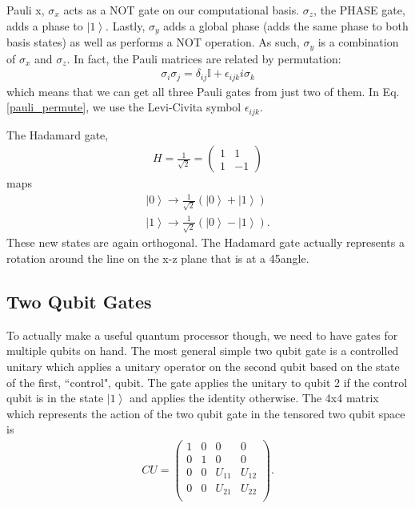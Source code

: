 \documentclass[11pt]{article} %
\newcommand{\ket}[1]{\left|#1\right\rangle}
\begin{document}
Pauli x, $\sigma_x$ acts as a NOT gate on our computational basis. $\sigma_z$, the PHASE gate, adds a phase to $\ket{1}$. Lastly, $\sigma_y$ adds a global phase (adds the same phase to both basis states) as well as performs a NOT operation. As such, $\sigma_y$ is a combination of $\sigma_x$ and $\sigma_z$. In fact, the Pauli matrices are related by permutation:
\begin{align}
    \sigma_i\sigma_j = \delta_{ij}\mathbb{I} + \epsilon_{ijk}i\sigma_k
    \label{pauli_permute}
\end{align}
which means that we can get all three Pauli gates from just two of them. In Eq. \ref{pauli_permute}, we use the Levi-Civita symbol $\epsilon_{ijk}$.

The Hadamard gate,
\begin{align}
    H=\frac{1}{\sqrt{2}} =
    \begin{pmatrix}
        1 & 1\\
        1 & -1
    \end{pmatrix}
\end{align}
maps
\begin{align}
    \ket{0} \rightarrow \frac{1}{\sqrt{2}}\left(\ket{0}+\ket{1}\right)\nonumber\\
    \ket{1} \rightarrow \frac{1}{\sqrt{2}}\left(\ket{0}-\ket{1}\right).\nonumber
\end{align}
These new states are again orthogonal. The Hadamard gate actually represents a rotation around the line on the x-z plane that is at a 45\degree angle.

\subsection{Two Qubit Gates}
To actually make a useful quantum processor though, we need to have gates for multiple qubits on hand. The most general simple two qubit gate is a controlled unitary which applies a unitary operator on the second qubit based on the state of the first, ``control", qubit. The gate applies the unitary to qubit 2 if the control qubit is in the state $\ket{1}$ and applies the identity otherwise. The 4x4 matrix which represents the action of the two qubit gate in the tensored two qubit space is
\begin{align}
    CU = 
    \begin{pmatrix}
    1 & 0 & 0 & 0\\
    0 & 1 & 0 & 0\\
    0 & 0 & U_{11} & U_{12}\\
    0 & 0 & U_{21} & U_{22}\\
    \end{pmatrix}.
\end{align}
\end{document}
